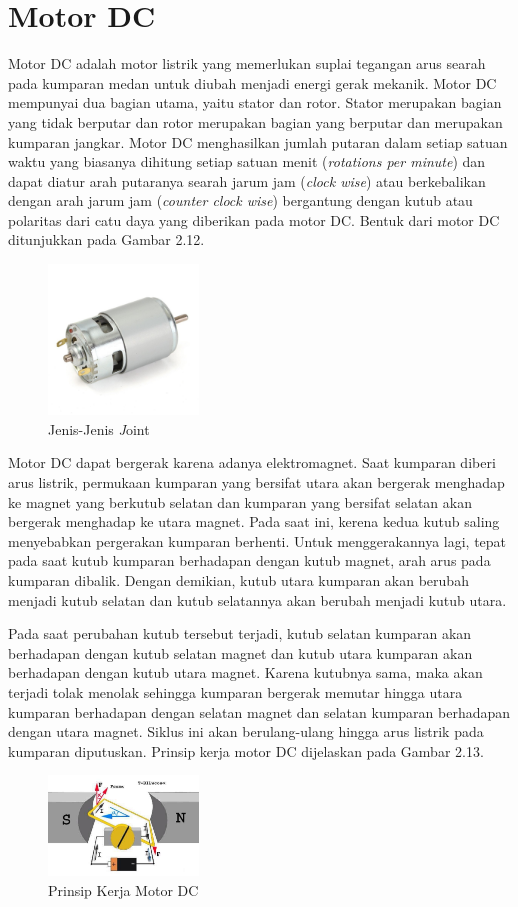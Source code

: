 \section{Motor DC}
Motor DC adalah motor listrik yang memerlukan suplai tegangan arus searah pada kumparan medan untuk diubah menjadi energi gerak mekanik. Motor DC mempunyai dua bagian utama, yaitu stator dan rotor. Stator merupakan bagian yang tidak berputar dan rotor merupakan bagian yang berputar dan merupakan kumparan jangkar. Motor DC menghasilkan jumlah putaran dalam setiap satuan waktu yang biasanya dihitung setiap satuan menit (\textit{rotations per minute}) dan dapat diatur arah putaranya searah jarum jam (\textit{clock wise}) atau berkebalikan dengan arah jarum jam (\textit{counter clock wise}) bergantung dengan kutub atau polaritas dari catu daya yang diberikan pada motor DC. Bentuk dari motor DC ditunjukkan pada Gambar 2.12.
	\begin{figure}[H]
	\centering
	\includegraphics[width=4cm]{gambar/motorDC.jpeg}
	\caption{Jenis-Jenis \emph Joint}
\end{figure}

Motor DC dapat bergerak karena adanya elektromagnet. Saat kumparan diberi arus listrik, permukaan kumparan yang bersifat utara akan bergerak menghadap ke magnet yang berkutub selatan dan kumparan yang bersifat selatan akan bergerak menghadap ke utara magnet. Pada saat ini, kerena kedua kutub saling menyebabkan pergerakan kumparan berhenti. Untuk menggerakannya lagi, tepat pada saat kutub kumparan berhadapan dengan kutub magnet, arah arus pada kumparan dibalik. Dengan demikian, kutub utara kumparan akan berubah menjadi kutub selatan dan kutub selatannya akan berubah menjadi kutub utara.  

Pada saat perubahan kutub tersebut terjadi, kutub selatan kumparan akan berhadapan dengan kutub selatan magnet dan kutub utara kumparan akan berhadapan dengan kutub utara magnet. Karena kutubnya sama, maka akan terjadi tolak menolak sehingga kumparan bergerak memutar hingga utara kumparan berhadapan dengan selatan magnet dan selatan kumparan berhadapan dengan utara magnet. Siklus ini akan berulang-ulang hingga arus listrik pada kumparan diputuskan. Prinsip kerja motor DC dijelaskan pada Gambar 2.13.  
	\begin{figure}[H]
	\centering
	\includegraphics[width=4cm]{gambar/prinsipDC.jpg}
	\caption{Prinsip Kerja Motor DC}
\end{figure}


